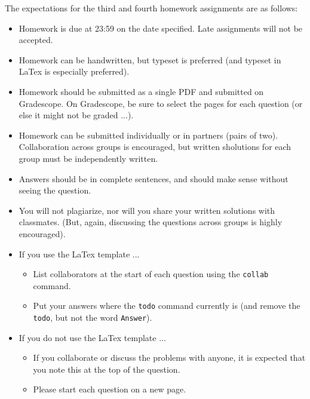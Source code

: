 The expectations for the third and fourth homework assignments are as follows:
\begin{itemize}
    \item Homework is due at 23:59 on the date specified.  Late assignments will
        not be accepted.
    \item Homework can be handwritten, but typeset is preferred (and typeset in
        LaTex is especially preferred).
    \item Homework should be submitted as a single PDF and submitted on
        Gradescope.  On Gradescope, be sure to select the pages for each
        question (or else it might not be graded ...).
    \item Homework can be submitted individually or in partners (pairs of two).
        Collaboration across groups is encouraged, but written sholutions for
        each group must be independently written.
    \item Answers should be in complete sentences, and should make sense without
        seeing the question.
    \item You will not plagiarize, nor will you share your written solutions
        with classmates.  (But, again, discussing the questions across groups is highly encouraged).
    \item If you use the LaTex template ...
        \begin{itemize}
            \item List collaborators at the start of each question using the \texttt{collab} command.
            \item Put your answers where the \texttt{todo} command currently is (and
                remove the \texttt{todo}, but not the word \texttt{Answer}).
        \end{itemize}
    \item If you do not use the LaTex template ...
        \begin{itemize}
            \item If you collaborate or discuss the problems with anyone, it is
                expected that you note this at the top of the question.
            \item Please start each question on a new page.
        \end{itemize}
\end{itemize}
